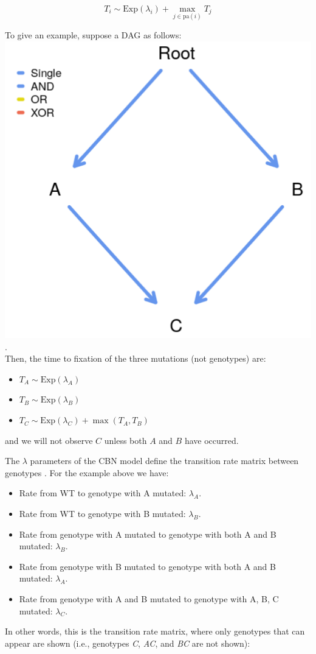 \documentclass[a4paper,11pt]{article}
\begin{document}
\begin{equation}
  T_i \sim \mathrm{Exp}(\lambda_i) + \max_{j \in \mathrm{pa}(i)} T_j
\end{equation}


To give an example, suppose a DAG as follows: \\

\includegraphics[width=.40\linewidth]{./dag_cbn.png}.\\


Then, the time to fixation of the three mutations (not genotypes) are:
\begin{itemize}
\item $T_A \sim \mathrm{Exp}(\lambda_A)$
\item $T_B \sim \mathrm{Exp}(\lambda_B)$
\item $T_C \sim \mathrm{Exp}(\lambda_C) + \max (T_A, T_B)$
\end{itemize}
and we will not observe $C$ unless both $A$ and $B$ have occurred. 


The $\lambda$ parameters of the CBN model define the transition rate matrix between genotypes \citep[see also][]{montazeri2016large}. For the example above we have:
\begin{itemize}
\item Rate from WT to genotype with A mutated: $\lambda_A$.
\item Rate from WT to genotype with B mutated: $\lambda_B$.
\item Rate from genotype with A mutated to genotype with both A and B mutated: $\lambda_B$.
\item Rate from genotype with B mutated to genotype with both A and B mutated: $\lambda_A$.
\item Rate from genotype with A and B mutated to genotype with A, B, C mutated: $\lambda_C$. 
\end{itemize}


In other words, this is the transition rate matrix, where only genotypes that can appear are shown (i.e., genotypes \textit{C}, \textit{AC}, and \textit{BC} are not shown):
\end{document}
